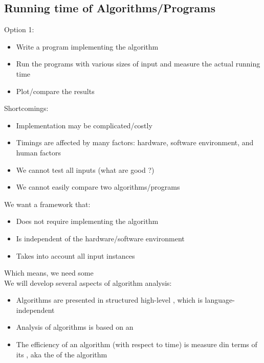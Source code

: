 \documentclass[letterpaper, 12pt]{article}
\newcommand{\red}[1]{{\color{red}{#1}}}
\begin{document}
    \subsection{Running time of Algorithms/Programs}
    Option 1: \red{Experimental Studies}
    \begin{itemize}
        \item Write a program implementing the algorithm
        \item Run the programs with various sizes of input and measure the actual running time
        \item Plot/compare the results
    \end{itemize}
    Shortcomings:
    \begin{itemize}
        \item Implementation may be complicated/costly
        \item Timings are affected by many factors: hardware, software environment, and human factors
        \item We cannot test all inputs (what are good \red{sample inputs}?)
        \item We cannot easily compare two algorithms/programs
    \end{itemize}
    We want a framework that:
    \begin{itemize}
        \item Does not require implementing the algorithm
        \item Is independent of the hardware/software environment
        \item Takes into account all input instances
    \end{itemize}
    Which means, we need some \red{simplifications}\\
    \bigskip
    We will develop several aspects of algorithm analysis:
    \begin{itemize}
        \item Algorithms are presented in structured high-level \red{pseudocode}, which is language-independent
        \item Analysis of algorithms is based on an \red{idealized computer model}
        \item The efficiency of an algorithm (with respect to time) is measure din terms of its \red{growth rate}, aka the \red{complexity} of the algorithm
    \end{itemize}
    \pagebreak
    
\end{document}
